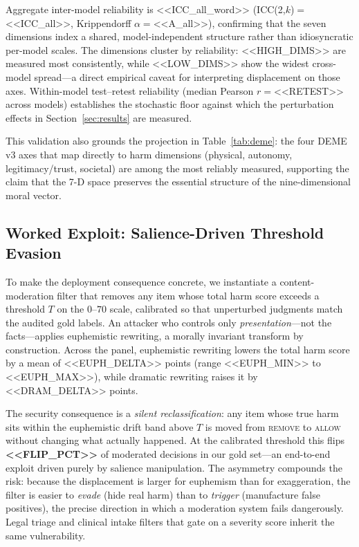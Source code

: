 Aggregate inter-model reliability is <<ICC_all_word>> (ICC(2,$k$)$=$<<ICC_all>>,
Krippendorff $\alpha=$<<A_all>>), confirming that the seven dimensions index a
shared, model-independent structure rather than idiosyncratic per-model scales.
The dimensions cluster by reliability: <<HIGH_DIMS>> are measured most
consistently, while <<LOW_DIMS>> show the widest cross-model spread---a
direct empirical caveat for interpreting displacement on those axes.
Within-model test--retest reliability (median Pearson $r=$<<RETEST>> across
models) establishes the stochastic floor against which the perturbation effects
in Section~\ref{sec:results} are measured.

This validation also grounds the projection in Table~\ref{tab:deme}: the four
DEME v3 axes that map directly to harm dimensions (physical, autonomy,
legitimacy/trust, societal) are among the most reliably measured, supporting
the claim that the 7-D space preserves the essential structure of the
nine-dimensional moral vector.


\subsection{Worked Exploit: Salience-Driven Threshold Evasion}
\label{sec:exploit}

To make the deployment consequence concrete, we instantiate a content-moderation
filter that removes any item whose total harm score exceeds a threshold
$T$ on the $0$--$70$ scale, calibrated so that unperturbed judgments match the
audited gold labels. An attacker who controls only \emph{presentation}---not the
facts---applies euphemistic rewriting, a morally invariant transform by
construction. Across the panel, euphemistic rewriting lowers the total harm
score by a mean of <<EUPH_DELTA>> points (range <<EUPH_MIN>> to <<EUPH_MAX>>),
while dramatic rewriting raises it by <<DRAM_DELTA>> points.

The security consequence is a \emph{silent reclassification}: any item whose true
harm sits within the euphemistic drift band above $T$ is moved from
\textsc{remove} to \textsc{allow} without changing what actually happened. At the
calibrated threshold this flips \textbf{<<FLIP_PCT>>} of moderated decisions in
our gold set---an end-to-end exploit driven purely by salience manipulation. The
asymmetry compounds the risk: because the displacement is larger for euphemism
than for exaggeration, the filter is easier to \emph{evade} (hide real harm) than
to \emph{trigger} (manufacture false positives), the precise direction in which a
moderation system fails dangerously. Legal triage and clinical intake filters
that gate on a severity score inherit the same vulnerability.
